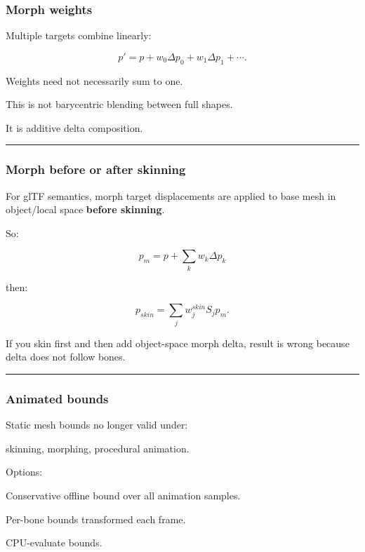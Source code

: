 \subsubsection{Morph weights}\label{morph-weights}

Multiple targets combine linearly:

\[
p'
=
p+
w_0\Delta p_0
+
w_1\Delta p_1
+\cdots.
\]

Weights need not necessarily sum to one.

This is not barycentric blending between full shapes.

It is additive delta composition.

\begin{center}\rule{0.5\linewidth}{0.5pt}\end{center}

\subsubsection{Morph before or after skinning}\label{morph-before-or-after-skinning}

For glTF semantics, morph target displacements are applied to base mesh in object/local space \textbf{before skinning}.

So:

\[
\boxed{
p_m=
p+
\sum_kw_k\Delta p_k
}
\]

then:

\[
\boxed{
p_{skin}
=
\sum_j
w_j^{skin}
S_j
p_m.
}
\]

If you skin first and then add object-space morph delta, result is wrong because delta does not follow bones.

\begin{center}\rule{0.5\linewidth}{0.5pt}\end{center}

\subsubsection{Animated bounds}\label{animated-bounds}

Static mesh bounds no longer valid under:

skinning, morphing, procedural animation.

Options:

Conservative offline bound over all animation samples.

Per-bone bounds transformed each frame.

CPU-evaluate bounds.

